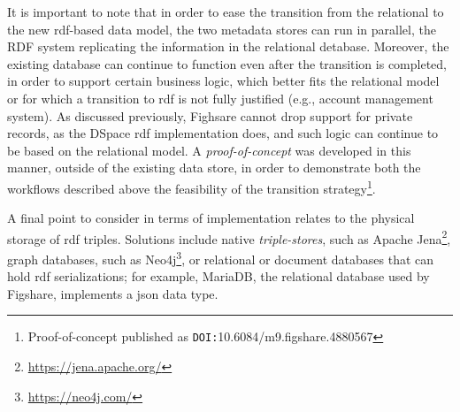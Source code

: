 It is important to note that in order to ease the transition from the relational to the new \gls{rdf}-based data model, the two metadata stores can run in parallel, the RDF system replicating the information in the relational detabase. Moreover, the existing database can continue to function even after the transition is completed, in order to support certain business logic, which better fits the relational model or for which a transition to \gls{rdf} is not fully justified (e.g., account management system). As discussed previously, Fighsare cannot drop support for private records, as the DSpace \gls{rdf} implementation does\cite{dspacerdf}, and such logic can continue to be based on the relational model. A \emph{proof-of-concept}  was developed in this manner, outside of the existing data store, in order to demonstrate both the workflows described above the feasibility of the transition strategy\footnote{Proof-of-concept published as \texttt{DOI:}10.6084/m9.figshare.4880567}. 

A final point to consider in terms of implementation relates to the physical storage of \gls{rdf} triples. Solutions include native \emph{triple-stores}, such as Apache Jena\footnote{\url{https://jena.apache.org/}}, graph databases, such as Neo4j\footnote{\url{https://neo4j.com/}}, or relational or document databases that can hold \gls{rdf} serializations; for example, MariaDB, the relational database used by Figshare, implements a \gls{json} data type\cite{mariadb}.

